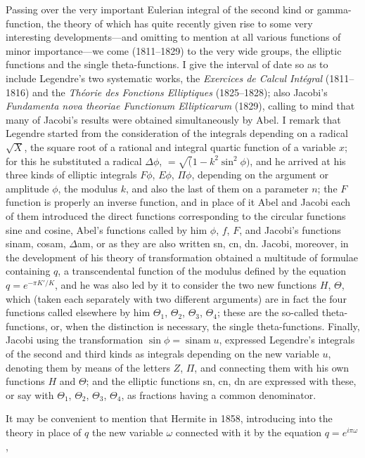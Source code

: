 \documentclass[12pt,a4paper,oneside]{book}
\begin{document}
Passing over the very important Eulerian integral of the second kind or gamma-function, the theory of which has quite recently given rise to some very interesting developments---and omitting to mention at all various functions of minor importance---we come (1811--1829) to the very wide groups, the elliptic functions and the single theta-functions. I give the interval of date so as to include Legendre's two systematic works, the \textit{Exercices de Calcul Int\'egral} (1811--1816) and the \textit{Th\'eorie des Fonctions Elliptiques} (1825--1828); also Jacobi's \textit{Fundamenta nova theoriae Functionum Ellipticarum} (1829), calling to mind that many of Jacobi's results were obtained simultaneously by Abel. I remark that Legendre started from the consideration of the integrals depending on a radical $\surd X$, the square root of a rational and integral quartic function of a variable $x$; for this he substituted a radical $\Delta\phi$, $=\surd(1-k^{2}\sin^{2}\phi)$, and he arrived at his three kinds of elliptic integrals $F\phi$, $E\phi$, $\Pi\phi$, depending on the argument or amplitude $\phi$, the modulus $k$, and also the last of them on a parameter $n$; the $F$ function is properly an inverse function, and in place of it Abel and Jacobi each of them introduced the direct functions corresponding to the circular functions sine and cosine, Abel's functions called by him $\phi$, $f$, $F$, and Jacobi's functions sinam, cosam, $\Delta$am, or as they are also written sn, cn, dn. Jacobi, moreover, in the development of his theory of transformation obtained a multitude of formulae containing $q$, a transcendental function of the modulus defined by the equation $q=e^{-\pi K'/K}$, and he was also led by it to consider the two new functions $H$, $\Theta$, which (taken each separately with two different arguments) are in fact the four functions called elsewhere by him $\Theta_{1}$, $\Theta_{2}$, $\Theta_{3}$, $\Theta_{4}$; these are the so-called theta-functions, or, when the distinction is necessary, the single theta-functions. Finally, Jacobi using the transformation $\sin\phi=\operatorname{sinam}u$, expressed Legendre's integrals of the second and third kinds as integrals depending on the new variable $u$, denoting them by means of the letters $Z$, $\Pi$, and connecting them with his own functions $H$ and $\Theta$; and the elliptic functions sn, cn, dn are expressed with these, or say with $\Theta_{1}$, $\Theta_{2}$, $\Theta_{3}$, $\Theta_{4}$, as fractions having a common denominator.

It may be convenient to mention that Hermite in 1858, introducing into the theory in place of $q$ the new variable $\omega$ connected with it by the equation $q=e^{i\pi\omega}$,
\end{document}
